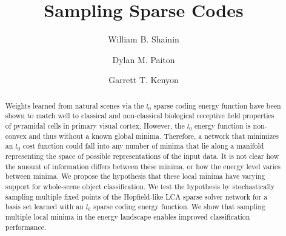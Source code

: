 \documentclass[smallextended]{svjour3}       %
\begin{document}
\title{Sampling Sparse Codes
}



\author{William B. Shainin \and
        Dylan M. Paiton \and
        Garrett T. Kenyon}





\date{}

\maketitle

\begin{abstract}
Weights learned from natural scenes via the $l_{0}$ sparse coding energy function have been shown to match well to classical and non-classical biological receptive field properties of pyramidal cells in primary visual cortex. However, the $l_{0}$ energy function is non-convex and thus without a known global minima. Therefore, a network that minimizes an $l_{0}$ cost function could fall into any number of minima that lie along a manifold representing the space of possible representations of the input data. It is not clear how the amount of information differs between these minima, or how the energy level varies between minima. We propose the hypothesis that these local minima have varying support for whole-scene object classification. We test the hypothesis by stochastically sampling multiple fixed points of the Hopfield-like LCA sparse solver network for a basis set learned with an $l_{0}$ sparse coding energy function. We show that sampling multiple local minima in the energy landscape enables improved classification performance.
\end{abstract}



\end{document}
